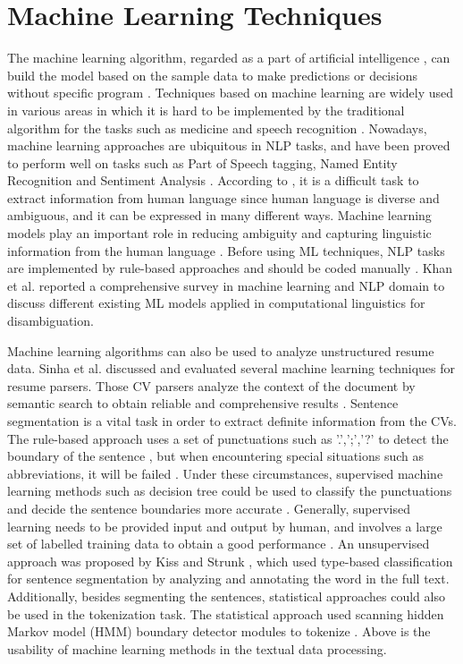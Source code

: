 \section{Machine Learning Techniques}

The machine learning algorithm, regarded as a part of artificial intelligence \cite{enwiki:1103198106}, can build the model based on the sample data to make predictions or decisions without specific program \cite{koza1996automated}. Techniques based on machine learning are widely used in various areas in which it is hard to be implemented by the traditional algorithm for the tasks such as medicine and speech recognition \cite{hu2020voronoi}. Nowadays, machine learning approaches are ubiquitous in NLP tasks, and have been proved to perform well on tasks such as Part of Speech tagging, Named Entity Recognition and Sentiment Analysis \cite{socher2012deep}. According to \cite{sinha2021resume}, it is a difficult task to extract information from human language since human language is diverse and ambiguous, and it can be expressed in many different ways. Machine learning models play an important role in reducing ambiguity and capturing linguistic information from the human language \cite{jurafsky2000speech}. Before using ML techniques, NLP tasks are implemented by rule-based approaches and should be coded manually \cite{khan2016survey}. Khan et al. \cite{khan2016survey} reported a comprehensive survey in machine learning and NLP domain to discuss different existing ML models applied in computational linguistics for disambiguation. 

Machine learning algorithms can also be used to analyze unstructured resume data. Sinha et al. \cite{sinha2021resume} discussed and evaluated several machine learning techniques for resume parsers. Those CV parsers analyze the context of the document by semantic search to obtain reliable and comprehensive results \cite{sinha2021resume}. Sentence segmentation is a vital task in order to extract definite information from the CVs. The rule-based approach uses a set of punctuations such as '.',';','?' to detect the boundary of the sentence \cite{reynar1997maximum}, but when encountering special situations such as abbreviations, it will be failed \cite{kiss2006unsupervised}. Under these circumstances, supervised machine learning methods such as decision tree could be used to classify the punctuations and decide the sentence boundaries more accurate \cite{riley1989some}. Generally, supervised learning needs to be provided input and output by human, and involves a large set of labelled training data to obtain a good performance \cite{saravanan2018state}. An unsupervised approach was proposed by Kiss and Strunk \cite{kiss2006unsupervised}, which used type-based classification for sentence segmentation by analyzing and annotating the word in the full text. Additionally, besides segmenting the sentences, statistical approaches could also be used in the tokenization task. The statistical approach used scanning hidden Markov model (HMM) boundary detector modules to tokenize \cite{jurish2013word}. Above is the usability of machine learning methods in the textual data processing. 

